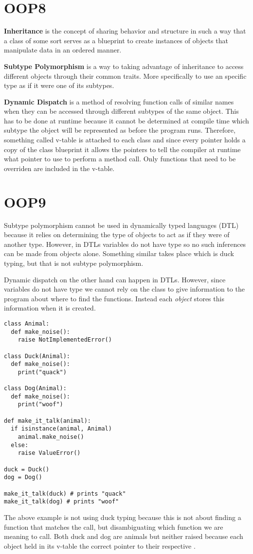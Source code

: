 \section*{OOP8}
\textbf{Inheritance} is the concept of sharing behavior and structure in
such a way that a class of some sort serves as a blueprint to create
instances of objects that manipulate data in an ordered manner.

\textbf{Subtype Polymorphism} is a way to taking advantage of
inheritance to access different objects through their common traits.
More specifically to use an specific type as if it were one of its
subtypes.

\textbf{Dynamic Dispatch} is a method of resolving function calls of
similar names when they can be accessed through different subtypes of
the same object. This has to be done at runtime because it cannot be
determined at compile time which subtype the object will be represented
as before the program runs. Therefore, something called v-table is
attached to each class and since every pointer holds a copy of the class
blueprint it allows the pointers to tell the compiler at runtime what
pointer to use to perform a method call. Only functions that need to be
overriden are included in the v-table.

\section*{OOP9}
Subtype polymorphism cannot be used in dynamically typed languages (DTL)
because it relies on determining the type of objects to act as if they
were of another type. However, in DTLs variables do not have type so no
such inferences can be made from objects alone. Something similar takes
place which is duck typing, but that is not subtype polymorphism.

Dynamic dispatch on the other hand can happen in DTLs. However, since
variables do not have type we cannot rely on the class to give
information to the program about where to find the functions. Instead
each \textit{object} stores this information when it is created.
\begin{verbatim}
class Animal:
  def make_noise():
    raise NotImplementedError()

class Duck(Animal):
  def make_noise():
    print("quack")

class Dog(Animal):
  def make_noise():
    print("woof")

def make_it_talk(animal):
  if isinstance(animal, Animal)
    animal.make_noise()
  else:
    raise ValueError()

duck = Duck()
dog = Dog()

make_it_talk(duck) # prints "quack"
make_it_talk(dog) # prints "woof"
\end{verbatim}
\noindent
The above example is not using duck typing because this is not about
finding a function that matches the call, but disambiguating which
function we are meaning to call. Both duck and dog are animals but
neither raised  because each object held in
its v-table the correct pointer to their respective
.

